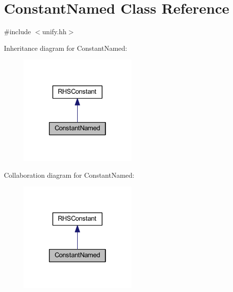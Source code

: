 \hypertarget{class_constant_named}{}\section{Constant\+Named Class Reference}
\label{class_constant_named}


{\ttfamily \#include $<$unify.\+hh$>$}



Inheritance diagram for Constant\+Named\+:
\nopagebreak
\begin{figure}[H]
\begin{center}
\leavevmode
\includegraphics[width=166pt]{class_constant_named__inherit__graph}
\end{center}
\end{figure}


Collaboration diagram for Constant\+Named\+:
\nopagebreak
\begin{figure}[H]
\begin{center}
\leavevmode
\includegraphics[width=166pt]{class_constant_named__coll__graph}
\end{center}
\end{figure}
